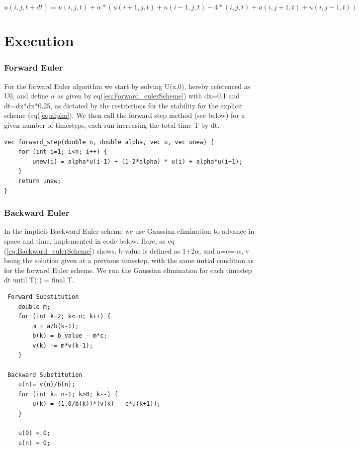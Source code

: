 \documentclass[a4paper,10pt]{article}
\begin{document}
\begin{equation}
  u(i,j,t+dt) = u(i,j,t) + \alpha*(u(i+1,j,t) + u(i-1,j,t) - 4*(i,j,t) + u(i,j+1,t) + u(i,j-1,t))
\label{eq:jacobi}
\end{equation}

\section{Execution}

\subsubsection{Forward Euler}
For the forward Euler algorithm we start by solving U(x,0), hereby referenced as U0, and define $\alpha$ as given by eq(\ref{eq:Forward_eulerScheme}) with dx=0.1 and dt=dx*dx*0.25, as dictated by the
restrictions for the stability for the explicit scheme (eq(\ref{eq:alpha}). We then call the forward step method (see below) for a given number of timesteps, each run increasing the total time T by dt.
\begin{verbatim}
vec forward_step(double n, double alpha, vec u, vec unew) {
    for (int i=1; i<n; i++) {
        unew(i) = alpha*u(i-1) + (1-2*alpha) * u(i) + alpha*u(i+1);
    }
    return unew;
} 
\end{verbatim}

\subsubsection{Backward Euler}
In the implicit Backward Euler scheme we use Gaussian elimination to advance in space and time, implemented in code below. Here, as eq (\ref{eq:Backward_eulerScheme}) shows, b-value is defined as
1+2$\alpha$, and a=c=-$\alpha$, v being the solution given at a previous timestep, with the same initial condition as for the forward Euler scheme. We run the Gaussian elimination for each timestep dt until T(i) = final T.

\begin{verbatim}
 Forward Substitution
    double m;
    for (int k=2; k<=n; k++) {
        m = a/b(k-1);
        b(k) = b_value - m*c;
        v(k) -= m*v(k-1);
    }

 Backward Substitution
    u(n)= v(n)/b(n);
    for (int k= n-1; k>0; k--) {
        u(k) = (1.0/b(k))*(v(k) - c*u(k+1));
    }

    u(0) = 0;
    u(n) = 0;
\end{verbatim}
\end{document}
